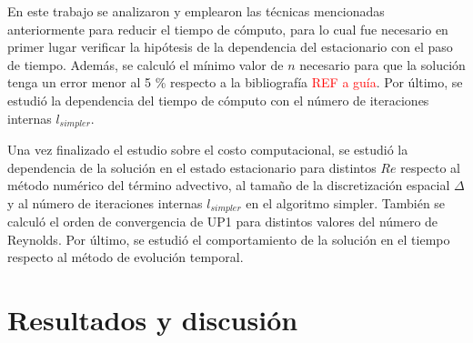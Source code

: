 \documentclass[aps,prb,twocolumn,superscriptaddress,floatfix,longbibliography,10pt]{revtex4-2}
\newif\ifptitle
\newif\ifpnumber
\newcounter{para}
\newcommand\ptitle[1]{\par\refstepcounter{para}
{\ifpnumber{\noindent\textcolor{lightgray}{\textbf{\thepara}}\indent}\fi}
{\ifptitle{\textbf{[{#1}]}}\fi}}
\begin{document}




\ptitle{Resumen de lo que se va a estudiar}

En este trabajo se analizaron y emplearon las técnicas mencionadas anteriormente para reducir el tiempo de cómputo, para lo cual fue necesario en primer lugar verificar la hipótesis de la dependencia del estacionario con el paso de tiempo. Además, se calculó el mínimo valor de $n$ necesario para que la solución tenga un error menor al 5 \% respecto a la bibliografía \textcolor{red}{REF a guía}. Por último, se estudió la dependencia del tiempo de cómputo con el número de iteraciones internas $l_{simpler}$.

Una vez finalizado el estudio sobre el costo computacional, se estudió la dependencia de la solución en el estado estacionario para distintos $Re$ respecto al método numérico del término advectivo, al tamaño de la discretización espacial $\Delta$ y al número de iteraciones internas $l_{simpler}$ en el algoritmo simpler. También se calculó el orden de convergencia de UP1 para distintos valores del número de Reynolds. Por último, se estudió el comportamiento de la solución en el tiempo respecto al método de evolución temporal. 

\section{Resultados y discusión}
\end{document}

